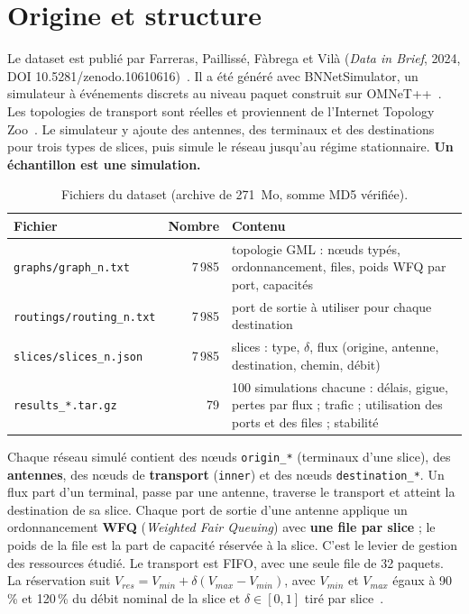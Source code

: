 \documentclass[11pt,a4paper]{report}
\begin{document}
\section{Origine et structure}
Le dataset est publié par Farreras, Paillissé, Fàbrega et Vilà (\emph{Data in Brief}, 2024, DOI 10.5281/zenodo.10610616)~\cite{farreras}. Il a été généré avec BNNetSimulator, un simulateur à événements discrets au niveau paquet construit sur OMNeT++~\cite{omnet}. Les topologies de transport sont réelles et proviennent de l'Internet Topology Zoo~\cite{topozoo}. Le simulateur y ajoute des antennes, des terminaux et des destinations pour trois types de slices, puis simule le réseau jusqu'au régime stationnaire. \textbf{Un échantillon est une simulation.}

\begin{table}[H]
\centering\small
\begin{tabularx}{\linewidth}{@{}lrX@{}}
\toprule
Fichier & Nombre & Contenu\\
\midrule
\texttt{graphs/graph\_n.txt} & 7\,985 & topologie GML : nœuds typés, ordonnancement, files, poids WFQ par port, capacités\\
\texttt{routings/routing\_n.txt} & 7\,985 & port de sortie à utiliser pour chaque destination\\
\texttt{slices/slices\_n.json} & 7\,985 & slices : type, $\delta$, flux (origine, antenne, destination, chemin, débit)\\
\texttt{results\_*.tar.gz} & 79 & 100 simulations chacune : délais, gigue, pertes par flux ; trafic ; utilisation des ports et des files ; stabilité\\
\bottomrule
\end{tabularx}
\caption{Fichiers du dataset (archive de 271~Mo, somme MD5 vérifiée).}
\end{table}

Chaque réseau simulé contient des nœuds \texttt{origin\_*} (terminaux d'une slice), des \textbf{antennes}, des nœuds de \textbf{transport} (\texttt{inner}) et des nœuds \texttt{destination\_*}. Un flux part d'un terminal, passe par une antenne, traverse le transport et atteint la destination de sa slice. Chaque port de sortie d'une antenne applique un ordonnancement \textbf{WFQ} (\emph{Weighted Fair Queuing}) avec \textbf{une file par slice} ; le poids de la file est la part de capacité réservée à la slice. C'est le levier de gestion des ressources étudié. Le transport est FIFO, avec une seule file de 32 paquets. La réservation suit $V_{res}=V_{min}+\delta(V_{max}-V_{min})$, avec $V_{min}$ et $V_{max}$ égaux à 90\,\% et 120\,\% du débit nominal de la slice et $\delta\in[0,1]$ tiré par slice~\cite{farreras}.
\end{document}
